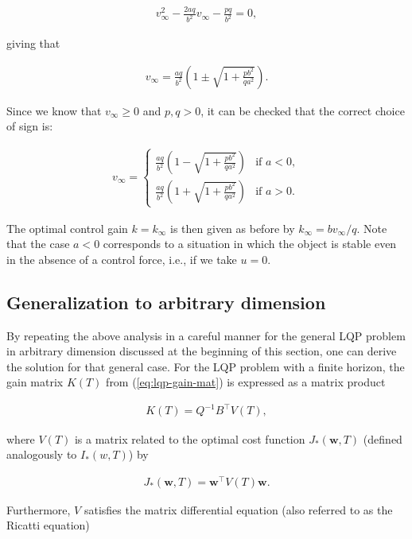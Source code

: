 \documentclass[11pt]{report}
\theoremstyle{plain}
\theoremstyle{definition}
\begin{document}
\begin{align*}
v_\infty^2 - \frac{2aq}{b^2} v_\infty - \frac{pq}{b^2} = 0,
\end{align*}

giving that

\begin{align*}
v_\infty = \frac{aq}{b^2}\left( 1 \pm \sqrt{1+\frac{pb^2}{qa^2}}\right).
\end{align*}

Since we know that $v_\infty\ge 0$ and $p,q>0$, it
can be checked that the correct choice of sign is:

\begin{align*}
v_\infty = \begin{cases}
\frac{aq}{b^2}\left( 1 - \sqrt{1+\frac{pb^2}{qa^2}}\right)
&
\textrm{if }a<0,  \\
\frac{aq}{b^2}\left( 1 + \sqrt{1+\frac{pb^2}{qa^2}}\right)
&
\textrm{if }a>0.
\end{cases}
\end{align*}

The optimal control gain $k=k_\infty$ is then given
as before by $k_\infty = b v_\infty/q$. Note that the
case $a<0$ corresponds to a situation in which the
object is stable even in the absence of a control
force, i.e., if we take $u=0$.

\subsection{Generalization to arbitrary dimension}
By repeating the above analysis in a careful manner
for the general LQP problem in arbitrary dimension
discussed at the beginning of this section, one can
derive the solution for that general case. For the LQP
problem with a finite horizon, the gain matrix $K(T)$
from (\ref{eq:lqp-gain-mat}) is expressed as a matrix
product

\begin{align*}
K(T) = Q^{-1}B^\top V(T),
\end{align*}

where $V(T)$ is a matrix related to the optimal cost
function $J_*(\mathbf{w},T)$ (defined analogously to
$I_*(w,T)$) by

\begin{align*}
J_*(\mathbf{w},T) = \mathbf{w}^\top V(T)\mathbf{w}.
\end{align*}

Furthermore, $V$ satisfies the matrix differential
equation (also referred to as the Ricatti equation)
\end{document}
